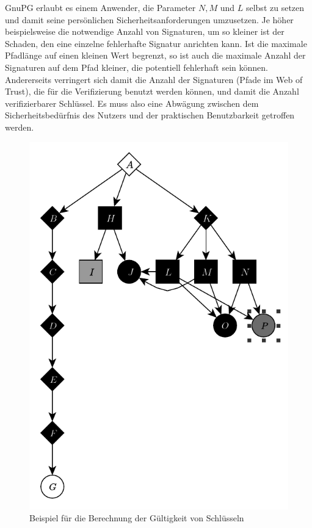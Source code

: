 GnuPG erlaubt es einem Anwender, die Parameter $N, M$ und $L$ selbst
zu setzen und damit seine pers\"onlichen Sicherheitsanforderungen
umzusetzen. Je höher beispielsweise die notwendige Anzahl von
Signaturen, um so kleiner ist der Schaden, den eine einzelne
fehlerhafte Signatur anrichten kann. Ist die maximale Pfadlänge auf
einen kleinen Wert begrenzt, so ist auch die maximale Anzahl der
Signaturen auf dem Pfad kleiner, die potentiell fehlerhaft sein
können. Andererseits verringert sich damit die Anzahl der Signaturen
(Pfade im Web of Trust), die für die Verifizierung benutzt werden
können, und damit die Anzahl verifizierbarer Schlüssel. Es muss also
eine Abwägung zwischen dem Sicherheitsbedürfnis des Nutzers und der
praktischen Benutzbarkeit getroffen werden.

\begin{figure}[t]
  \centering
  \includegraphics[scale=1.0]{images/trust-beispiel.pdf}
  \caption{Beispiel für die Berechnung der Gültigkeit von Schlüsseln}
  \label{fig:trust-beispiel}
\end{figure}

